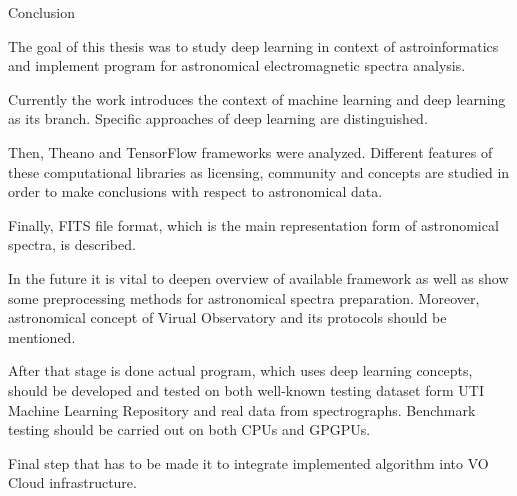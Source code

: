 \chap Conclusion

The goal of this thesis was to study deep learning in context of
astroinformatics and implement program for astronomical electromagnetic spectra
analysis.

Currently the work introduces the context of machine learning and deep learning
as its branch. Specific approaches of deep learning are distinguished.

Then, Theano and TensorFlow frameworks were analyzed. Different features of these
computational libraries as licensing, community and concepts are studied in
order to make conclusions with respect to astronomical data.

Finally, FITS file format, which is the main representation form of astronomical
spectra, is described.

In the future it is vital to deepen overview of available framework as well
as show some preprocessing methods for astronomical spectra preparation.
Moreover, astronomical concept of Virual Observatory and its protocols should
be mentioned.

After that stage is done actual program, which uses deep learning concepts,
should be developed and tested on both well-known testing dataset form UTI
Machine Learning Repository
and real data from spectrographs.
Benchmark testing should be carried out on both CPUs and GPGPUs.

Final step that has to be made it to integrate implemented algorithm into VO
Cloud infrastructure.
